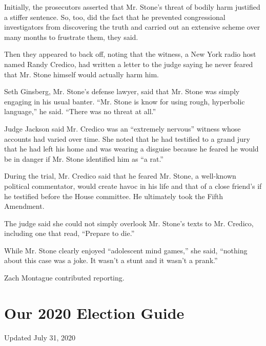 Initially, the prosecutors asserted that Mr. Stone's threat of bodily
harm justified a stiffer sentence. So, too, did the fact that he
prevented congressional investigators from discovering the truth and
carried out an extensive scheme over many months to frustrate them, they
said.

Then they appeared to back off, noting that the witness, a New York
radio host named Randy Credico, had written a letter to the judge saying
he never feared that Mr. Stone himself would actually harm him.

Seth Ginsberg, Mr. Stone's defense lawyer, said that Mr. Stone was
simply engaging in his usual banter. ``Mr. Stone is know for using
rough, hyperbolic language,'' he said. ``There was no threat at all.''

Judge Jackson said Mr. Credico was an ``extremely nervous'' witness
whose accounts had varied over time. She noted that he had testified to
a grand jury that he had left his home and was wearing a disguise
because he feared he would be in danger if Mr. Stone identified him as
``a rat.''

During the trial, Mr. Credico said that he feared Mr. Stone, a
well-known political commentator, would create havoc in his life and
that of a close friend's if he testified before the House committee. He
ultimately took the Fifth Amendment.

The judge said she could not simply overlook Mr. Stone's texts to Mr.
Credico, including one that read, ``Prepare to die.''

While Mr. Stone clearly enjoyed ``adolescent mind games,'' she said,
``nothing about this case was a joke. It wasn't a stunt and it wasn't a
prank.''

Zach Montague contributed reporting.

\hypertarget{our-2020-election-guide}{%
\section{Our 2020 Election Guide}\label{our-2020-election-guide}}

Updated July 31, 2020

